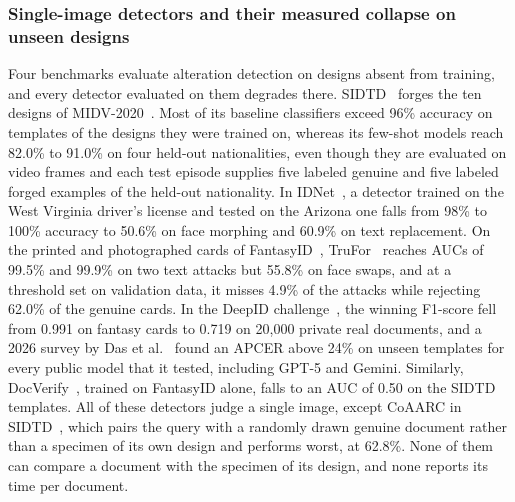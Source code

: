 \documentclass[12pt,a4paper]{article}
\newif\ifshowguidance
\newcommand{\todo}[1]{\ifshowguidance\leavevmode{\color{gray}\itshape [#1]}\fi}
\begin{document}
\subsubsection{Single-image detectors and their measured collapse on unseen designs}
Four benchmarks evaluate alteration detection on designs absent from training, and every detector evaluated on them degrades there. SIDTD~\cite{boned2024sidtd} forges the ten designs of MIDV-2020~\cite{bulatov2022midv2020}. Most of its baseline classifiers exceed 96\% accuracy on templates of the designs they were trained on, whereas its few-shot models reach 82.0\% to 91.0\% on four held-out nationalities, even though they are evaluated on video frames and each test episode supplies five labeled genuine and five labeled forged examples of the held-out nationality. In IDNet~\cite{guan2024idnetarxiv}, a detector trained on the West Virginia driver's license and tested on the Arizona one falls from 98\% to 100\% accuracy to 50.6\% on face morphing and 60.9\% on text replacement. On the printed and photographed cards of FantasyID~\cite{korshunov2025fantasyid}, TruFor~\cite{guillaro2023trufor} reaches AUCs of 99.5\% and 99.9\% on two text attacks but 55.8\% on face swaps, and at a threshold set on validation data, it misses 4.9\% of the attacks while rejecting 62.0\% of the genuine cards. In the DeepID challenge~\cite{korshunov2025deepid}, the winning F1-score fell from 0.991 on fantasy cards to 0.719 on 20,000 private real documents, and a 2026 survey by Das et al.~\cite{das2026survey} found an APCER above 24\% on unseen templates for every public model that it tested, including GPT-5 and Gemini. Similarly, DocVerify~\cite{diazrodriguez2026docverify}, trained on FantasyID alone, falls to an AUC of 0.50 on the SIDTD templates. All of these detectors judge a single image, except CoAARC in SIDTD~\cite{boned2024sidtd}, which pairs the query with a randomly drawn genuine document rather than a specimen of its own design and performs worst, at 62.8\%. None of them can compare a document with the specimen of its design, and none reports its time per document.
\todo{Consistency with Section~\ref{sec:results} (11 Oct). SIDTD's results above 96\% on seen designs rest on the JPEG quality of its files, and its clips store genuine frames as JPEG and forged ones as PNG, so SIDTD's gap between seen and unseen designs is confounded. A later few-shot model from the SIDTD group, Talarmain et al.~\cite{talarmain2024fewshot}, reaches AUCs of 99.9\% to 100\% on the clips of held-out nationalities, which also qualifies ``every detector evaluated on them degrades there''. Decide whether this paragraph, the Introduction, and panel (A) of Fig.~\ref{fig:idea} should say so.}
\end{document}
